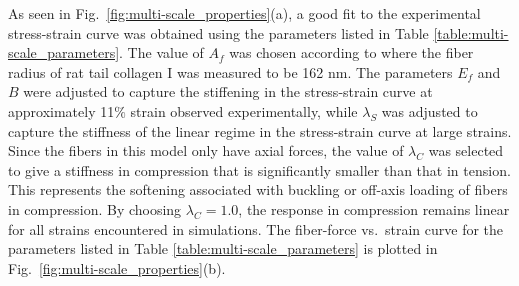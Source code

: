 \documentclass[]{interact}
\begin{document}

As seen in Fig.\ \ref{fig:multi-scale_properties}(a), a good fit to the experimental stress-strain curve was obtained using the parameters listed in Table \ref{table:multi-scale_parameters}. The value of $A_f$ was chosen according to \citep{Dutov:2016gu} where the fiber radius of rat tail collagen I was measured to be 162 nm. The parameters $E_f$ and $B$ were adjusted to capture the stiffening in the stress-strain curve at approximately 11$\%$ strain observed experimentally, while $\lambda_S$ was adjusted to capture the stiffness of the linear regime in the stress-strain curve at large strains. Since the fibers in this model only have axial forces, the value of $\lambda_C$ was selected to give a stiffness in compression that is significantly smaller than that in tension. This represents the softening associated with buckling or off-axis loading of fibers in compression. By choosing $\lambda_C = 1.0$, the response in compression remains linear for all strains encountered in simulations. The fiber-force vs.\ strain curve for the parameters listed in Table \ref{table:multi-scale_parameters} is plotted in Fig.\ \ref{fig:multi-scale_properties}(b).
%
\end{document}
